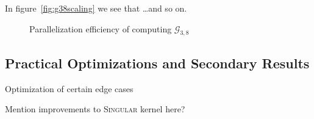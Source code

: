 \documentclass[
  paper=a4,
  titlepage,
  bibliography=totoc,
  listof=totoc,
  pagesize=pdftex
]{scrartcl}
\numberwithin{figure}{section}
\numberwithin{equation}{section}
\numberwithin{table}{section}
\theoremstyle{definition}
\numberwithin{definition}{section}
\begin{document}
In figure~\ref{fig:g38scaling} we see that \dots and so on.

\begin{figure}[htbp]
  \begin{center}
    
  \end{center}
  \caption{Parallelization efficiency of computing $\mathcal{G}_{3,8}$}
  \label{fig:g38efficiency}
\end{figure}

\subsection{Practical Optimizations and Secondary Results}

Optimization of certain edge cases

Mention improvements to \textsc{Singular} kernel here?

\newpage
\listoffigures
\newpage%
\printbibliography
\end{document}
